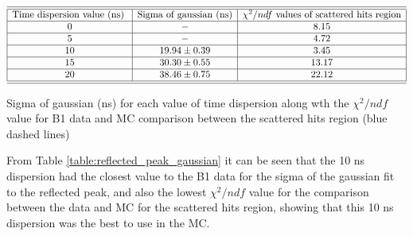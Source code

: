 \begin{table}[htp]
$$
\begin{array}{|c|c|c|}  
    \hline \hline{\text {Time dispersion value (ns) }} & {\text {Sigma of gaussian (ns)}} & {\text {$\chi^{2}/ndf$ values of scattered hits region}}  \tabularnewline
    \hline \text { 0 } & - & 8.15 \\
    \hline \text { 5 } & - & 4.72 \\
    \hline \text { 10 } & 19.94 \pm 0.39 & 3.45 \\
    \hline \text { 15 } & 30.30 \pm 0.55 & 13.17 \\
    \hline \text { 20 } & 38.46 \pm 0.75 & 22.12 \\
    \hline \hline 
\end{array}
 $$   
\caption{Sigma of gaussian (ns) for each value of time dispersion along wth the $\chi^2/ndf$ value for B1 data and MC comparison between the scattered hits region (blue dashed lines)} 
\label{table:reflected_peak_gaussian}
\end{table}

From Table \ref{table:reflected_peak_gaussian} it can be seen that the 10 ns dispersion had the closest value to the B1 data for the sigma of the gaussian fit to the reflected peak, and also the lowest $\chi^2/ndf$ value for the comparison between the data and MC for the scattered hits region, showing that this 10 ns dispersion was the best to use in the MC. 



